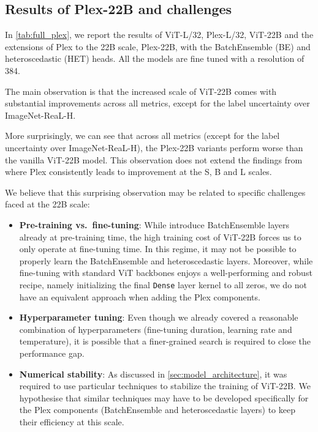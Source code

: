\documentclass{article}
\begin{document}
\subsection{Results of Plex-22B and challenges}

In \cref{tab:full_plex}, we report the results of ViT-L/32, Plex-L/32, ViT-22B and the extensions of Plex to the 22B scale, Plex-22B, with the BatchEnsemble (BE) and heteroscedastic (HET) heads. All the models are fine tuned with a resolution of 384. 

The main observation is that the increased scale of ViT-22B comes with substantial improvements across all metrics, except for the label uncertainty over ImageNet-ReaL-H.

More surprisingly, we can see that across all metrics (except for the label uncertainty over ImageNet-ReaL-H), the Plex-22B variants perform worse than the vanilla ViT-22B model. This observation does not extend the findings from \citet{tran2022plex} where Plex consistently leads to improvement at the S, B and L scales.

We believe that this surprising observation may be related to specific challenges faced at the 22B scale:
\begin{itemize}
    \item \textbf{Pre-training vs.~fine-tuning}: While \citet{tran2022plex} introduce BatchEnsemble layers already at pre-training time, the high training cost of ViT-22B forces us to only operate at fine-tuning time. In this regime, it may not be possible to properly learn the BatchEnsemble and heteroscedastic layers. 
    Moreover, while fine-tuning with standard ViT backbones enjoys a well-performing and robust recipe, namely  initializing the final \texttt{Dense} layer kernel to all zeros, we do not have an equivalent approach when adding the Plex components. 
    \item \textbf{Hyperparameter tuning}: Even though we already covered a reasonable combination of hyperparameters (fine-tuning duration, learning rate and temperature), it is possible that a finer-grained search is required to close the performance gap.
    \item \textbf{Numerical stability}: As discussed in \cref{sec:model_architecture}, it was required to use particular techniques to stabilize the training of ViT-22B. We hypothesise that similar techniques may have to be developed specifically for the Plex components (BatchEnsemble and heteroscedastic layers) to keep their efficiency at this scale.
\end{itemize}
\end{document}
